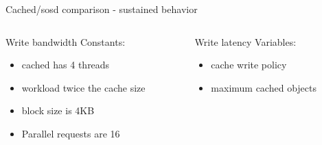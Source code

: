 \begin{frame}{Cached/sosd comparison - sustained behavior}
	\begin{columns}[t]
		\begin{column}{.5\textwidth}
			Write bandwidth
			Constants:
			\begin{itemize}
				\item cached has 4 threads
				\item workload twice the cache size
				\item block size is 4KB
				\item Parallel requests are 16
			\end{itemize}
		\end{column}
		\begin{column}{.5\textwidth}
			Write latency
			Variables:
			\begin{itemize}
				\item cache write policy
				\item maximum cached objects
			\end{itemize}
		\end{column}
	\end{columns}

\end{frame}

